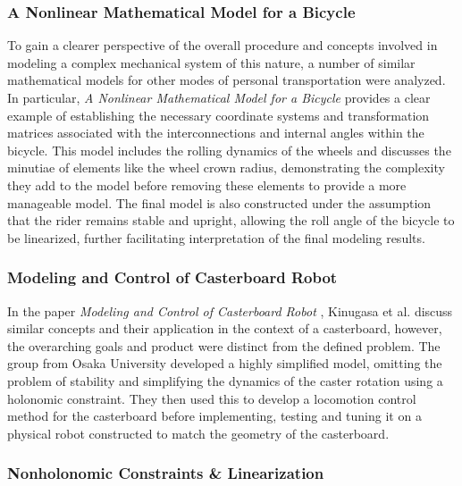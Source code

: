 \subsubsection{A Nonlinear Mathematical Model for a Bicycle}
To gain a clearer perspective of the overall procedure and concepts involved in modeling a complex mechanical system of this nature, a number of similar mathematical models for other modes of personal transportation were analyzed.
In particular, \textit{A Nonlinear Mathematical Model for a Bicycle} \cite{bicycle} provides a clear example of establishing the necessary coordinate systems and transformation matrices associated with the interconnections and internal angles within the bicycle.
This model includes the rolling dynamics of the wheels and discusses the minutiae of elements like the wheel crown radius, demonstrating the complexity they add to the model before removing these elements to provide a more manageable model.
The final model is also constructed under the assumption that the rider remains stable and upright, allowing the roll angle of the bicycle to be linearized, further facilitating interpretation of the final modeling results. 

\subsubsection{Modeling and Control of Casterboard Robot}
In the paper \textit{Modeling and Control of Casterboard Robot} \cite{robot}, Kinugasa et al. discuss similar concepts and their application in the context of a casterboard, however, the overarching goals and product were distinct from the defined problem.
The group from Osaka University developed a highly simplified model, omitting the problem of stability and simplifying the dynamics of the caster rotation using a holonomic constraint. 
They then used this to develop a locomotion control method for the casterboard before implementing, testing and tuning it on a physical robot constructed to match the geometry of the casterboard.

\subsubsection{Nonholonomic Constraints \& Linearization}
